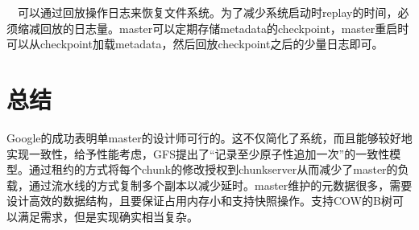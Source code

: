 \documentclass{article}
\begin{document}
  可以通过回放操作日志来恢复文件系统。为了减少系统启动时replay的时间，必须缩减回放的日志量。master可以定期存储metadata的checkpoint，master重启时可以从checkpoint加载metadata，然后回放checkpoint之后的少量日志即可。


\section{总结}

Google的成功表明单master的设计师可行的。这不仅简化了系统，而且能够较好地实现一致性，给予性能考虑，GFS提出了“记录至少原子性追加一次”的一致性模型。通过租约的方式将每个chunk的修改授权到chunkserver从而减少了master的负载，通过流水线的方式复制多个副本以减少延时。master维护的元数据很多，需要设计高效的数据结构，且要保证占用内存小和支持快照操作。支持COW的B树可以满足需求，但是实现确实相当复杂。
\end{document}
